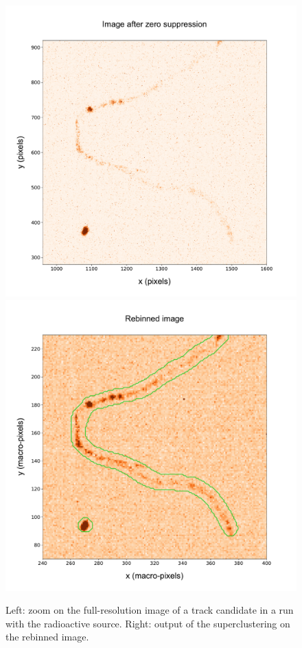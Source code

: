 \begin{figure}[ht]
  \begin{center}
     \includegraphics[width=0.49\linewidth]{figures/pic_run02317_ev8_oriIma_paper_zoom}
      \includegraphics[width=0.49\linewidth]{figures/pic_run02317_ev8_sc_3D_paper}
      \caption{Left: zoom on the full-resolution image of a
        track candidate in a run with the \ambe radioactive
        source. Right: output of the superclustering on the rebinned
        image. \label{fig:super_clusters1}}
  \end{center}
\end{figure}
%

